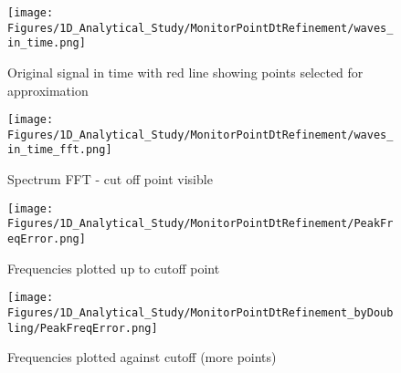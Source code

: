 \begin{figure}
\texttt{[image: Figures/1D\_Analytical\_Study/MonitorPointDtRefinement/waves\_in\_time.png]}
\caption{Original signal in time with red line showing points selected for approximation}
\end{figure}

\begin{figure}
\texttt{[image: Figures/1D\_Analytical\_Study/MonitorPointDtRefinement/waves\_in\_time\_fft.png]}
\caption{Spectrum FFT - cut off point visible}
\end{figure}

\begin{figure}
\texttt{[image: Figures/1D\_Analytical\_Study/MonitorPointDtRefinement/PeakFreqError.png]}
\caption{Frequencies plotted up to cutoff point}
\end{figure}

\begin{figure}
\texttt{[image: Figures/1D\_Analytical\_Study/MonitorPointDtRefinement\_byDoubling/PeakFreqError.png]}
\caption{Frequencies plotted against cutoff (more points)}
\end{figure}